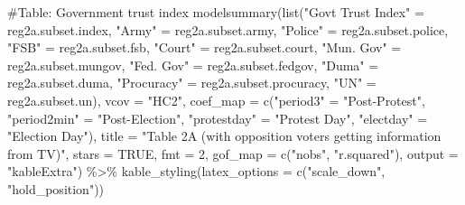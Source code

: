 \documentclass[
  letterpaper,
  DIV=11,
  numbers=noendperiod]{scrartcl}
\newenvironment{Shaded}{\begin{snugshade}}{\end{snugshade}}
\newcommand{\AttributeTok}[1]{\textcolor[rgb]{0.40,0.45,0.13}{#1}}
\newcommand{\CommentTok}[1]{\textcolor[rgb]{0.37,0.37,0.37}{#1}}
\newcommand{\ConstantTok}[1]{\textcolor[rgb]{0.56,0.35,0.01}{#1}}
\newcommand{\DecValTok}[1]{\textcolor[rgb]{0.68,0.00,0.00}{#1}}
\newcommand{\FunctionTok}[1]{\textcolor[rgb]{0.28,0.35,0.67}{#1}}
\newcommand{\NormalTok}[1]{\textcolor[rgb]{0.00,0.23,0.31}{#1}}
\newcommand{\OtherTok}[1]{\textcolor[rgb]{0.00,0.23,0.31}{#1}}
\newcommand{\SpecialCharTok}[1]{\textcolor[rgb]{0.37,0.37,0.37}{#1}}
\newcommand{\StringTok}[1]{\textcolor[rgb]{0.13,0.47,0.30}{#1}}
\begin{document}
\begin{Shaded}
\begin{Highlighting}[]
\CommentTok{\#Table: Government trust index}
\FunctionTok{modelsummary}\NormalTok{(}\FunctionTok{list}\NormalTok{(}\StringTok{"Gov\textquotesingle{}t Trust Index"} \OtherTok{=}\NormalTok{ reg2a.subset.index, }\StringTok{"Army"} \OtherTok{=}\NormalTok{ reg2a.subset.army, }\StringTok{"Police"} \OtherTok{=}\NormalTok{ reg2a.subset.police, }\StringTok{"FSB"} \OtherTok{=}\NormalTok{ reg2a.subset.fsb, }\StringTok{"Court"} \OtherTok{=}\NormalTok{ reg2a.subset.court, }\StringTok{"Mun. Gov"} \OtherTok{=}\NormalTok{ reg2a.subset.mungov, }\StringTok{"Fed. Gov"} \OtherTok{=}\NormalTok{ reg2a.subset.fedgov, }\StringTok{"Duma"} \OtherTok{=}\NormalTok{ reg2a.subset.duma, }\StringTok{"Procuracy"} \OtherTok{=}\NormalTok{ reg2a.subset.procuracy, }\StringTok{"UN"} \OtherTok{=}\NormalTok{ reg2a.subset.un),}
             \AttributeTok{vcov =} \StringTok{"HC2"}\NormalTok{,}
             \AttributeTok{coef\_map =} \FunctionTok{c}\NormalTok{(}\StringTok{"period3"} \OtherTok{=} \StringTok{"Post{-}Protest"}\NormalTok{,}
                          \StringTok{"period2min"} \OtherTok{=} \StringTok{"Post{-}Election"}\NormalTok{,}
                          \StringTok{"protestday"} \OtherTok{=} \StringTok{"Protest Day"}\NormalTok{,}
                          \StringTok{"electday"} \OtherTok{=} \StringTok{"Election Day"}\NormalTok{),}
             \AttributeTok{title =} \StringTok{"Table 2A (with opposition voters getting information from TV)"}\NormalTok{,}
             \AttributeTok{stars =} \ConstantTok{TRUE}\NormalTok{, }\AttributeTok{fmt =} \DecValTok{2}\NormalTok{, }\AttributeTok{gof\_map  =} \FunctionTok{c}\NormalTok{(}\StringTok{"nobs"}\NormalTok{, }\StringTok{"r.squared"}\NormalTok{),}
             \AttributeTok{output =} \StringTok{"kableExtra"}\NormalTok{)  }\SpecialCharTok{\%\textgreater{}\%} 
  \FunctionTok{kable\_styling}\NormalTok{(}\AttributeTok{latex\_options =} \FunctionTok{c}\NormalTok{(}\StringTok{"scale\_down"}\NormalTok{, }\StringTok{"hold\_position"}\NormalTok{))}
\end{Highlighting}
\end{Shaded}
\end{document}
